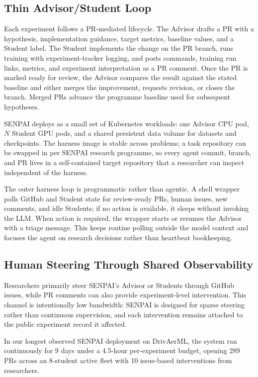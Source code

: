 \documentclass{article}
\begin{document}
\subsection{Thin Advisor/Student Loop}

Each experiment follows a PR-mediated lifecycle. The Advisor drafts a PR with a hypothesis, implementation guidance, target metrics, baseline values, and a Student label. The Student implements the change on the PR branch, runs training with experiment-tracker logging, and posts commands, training run links, metrics, and experiment interpretation as a PR comment. Once the PR is marked ready for review, the Advisor compares the result against the stated baseline and either merges the improvement, requests revision, or closes the branch. Merged PRs advance the programme baseline used for subsequent hypotheses.

SENPAI deploys as a small set of Kubernetes workloads: one Advisor CPU pod, $N$ Student GPU pods, and a shared persistent data volume for datasets and checkpoints. The harness image is stable across problems; a task repository can be swapped in per SENPAI research programme, so every agent commit, branch, and PR lives in a self-contained target repository that a researcher can inspect independent of the harness.

The outer harness loop is programmatic rather than agentic. A shell wrapper polls GitHub and Student state for review-ready PRs, human issues, new comments, and idle Students; if no action is available, it sleeps without invoking the LLM. When action is required, the wrapper starts or resumes the Advisor with a triage message. This keeps routine polling outside the model context and focuses the agent on research decisions rather than heartbeat bookkeeping.

\subsection{Human Steering Through Shared Observability}

Researchers primarily steer SENPAI's Advisor or Students through GitHub issues, while PR comments can also provide experiment-level intervention. This channel is intentionally low bandwidth: SENPAI is designed for sparse steering rather than continuous supervision, and each intervention remains attached to the public experiment record it affected.

In our longest observed SENPAI deployment on DrivAerML, the system ran continuously for 9 days under a 4.5-hour per-experiment budget, opening 289 PRs across an 8-student active fleet with 10 issue-based interventions from researchers.
\end{document}
